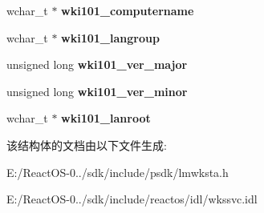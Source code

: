\begin{DoxyCompactItemize}
wchar\+\_\+t $\ast$ {\bfseries wki101\+\_\+computername}
\item 
\mbox{\label{struct___w_k_s_t_a___i_n_f_o__101_a58059fb83a7b9d38d61e4817452edc60}} 
wchar\+\_\+t $\ast$ {\bfseries wki101\+\_\+langroup}
\item 
\mbox{\label{struct___w_k_s_t_a___i_n_f_o__101_aa8a64f91da5ff858cd62b576c5723ef0}} 
unsigned long {\bfseries wki101\+\_\+ver\+\_\+major}
\item 
\mbox{\label{struct___w_k_s_t_a___i_n_f_o__101_a9e35033d0c4f0c28d15423cce05e0794}} 
unsigned long {\bfseries wki101\+\_\+ver\+\_\+minor}
\item 
\mbox{\label{struct___w_k_s_t_a___i_n_f_o__101_a5b537648d84bc5735af8452cd0ba912e}} 
wchar\+\_\+t $\ast$ {\bfseries wki101\+\_\+lanroot}
\end{DoxyCompactItemize}


该结构体的文档由以下文件生成\+:\begin{DoxyCompactItemize}
\item 
E\+:/\+React\+O\+S-\/0../sdk/include/psdk/lmwksta.\+h\item 
E\+:/\+React\+O\+S-\/0../sdk/include/reactos/idl/wkssvc.\+idl\end{DoxyCompactItemize}
